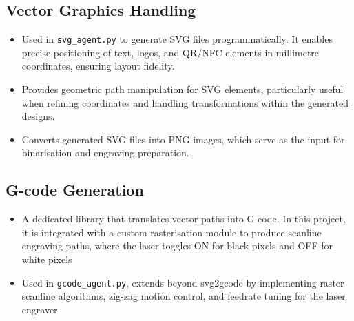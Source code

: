\subsection{Vector Graphics Handling}
\begin{itemize}
	\item {}
	
Used in \texttt{svg\_agent.py} to generate SVG files programmatically. It enables precise positioning of text, logos, and QR/NFC elements in millimetre coordinates, ensuring layout fidelity.
	
	\item {}
	
Provides geometric path manipulation for SVG elements, particularly useful when refining coordinates and handling transformations within the generated designs.
	
	\item {}
	
Converts generated SVG files into PNG images, which serve as the input for binarisation and engraving preparation.

\end{itemize}

\subsection{G-code Generation}
\begin{itemize}
	\item {}
	
A dedicated library that translates vector paths into G-code. In this project, it is integrated with a custom rasterisation module to produce scanline engraving paths, where the laser toggles ON for black pixels and OFF for white pixels
	
\item {}
	
Used in \texttt{gcode\_agent.py}, extends beyond svg2gcode by implementing raster scanline algorithms, zig-zag motion control, and feedrate tuning for the laser engraver.
	
\end{itemize}

